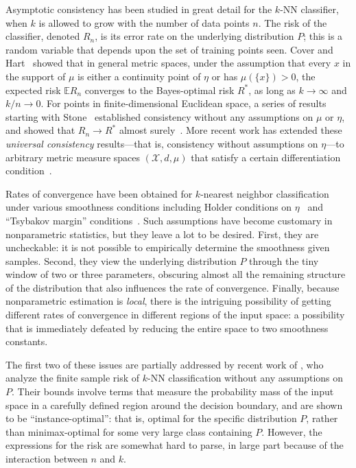 \documentclass{article}
\def\E{{\mathbb E}}
\def\X{{\mathcal X}}
\begin{document}
Asymptotic consistency has been studied in great detail for the $k$-NN classifier, when $k$ is allowed to grow with the number of data points $n$. The risk of the classifier, denoted $R_n$, is its error rate on the underlying distribution $P$; this is a random variable that depends upon the set of training points seen. Cover and Hart~\cite{CH67} showed that in general metric spaces, under the assumption that every $x$ in the support of $\mu$ is either a continuity point of $\eta$ or has $\mu(\{x\}) > 0$, the expected risk $\E R_n$ converges to the Bayes-optimal risk $R^*$, as long as $k \rightarrow \infty$ and $k/n \rightarrow 0$. For points in finite-dimensional Euclidean space, a series of results starting with Stone~\cite{S77} established consistency without any assumptions on $\mu$ or $\eta$, and showed that $R_n \rightarrow R^*$ almost surely~\cite{DGKL94}. More recent work has extended these {\it universal consistency} results---that is, consistency without assumptions on $\eta$---to arbitrary metric measure spaces $(\X, d, \mu)$ that satisfy a certain differentiation condition~\cite{CG06,ChaudhuriDasgupta2014}.

Rates of convergence have been obtained for $k$-nearest neighbor classification under various smoothness conditions including Holder conditions on $\eta$~\cite{KP95,G81} and ``Tsybakov margin'' conditions~\cite{MT99,AT07,ChaudhuriDasgupta2014}. Such assumptions have become customary in nonparametric statistics, but they leave a lot to be desired. First, they are uncheckable: it is not possible to empirically determine the smoothness given samples. Second, they view the underlying distribution $P$ through the tiny window of two or three parameters, obscuring almost all the remaining structure of the distribution that also influences the rate of convergence. Finally, because nonparametric estimation is {\it local}, there is the intriguing possibility of getting different rates of convergence in different regions of the input space: a possibility that is immediately defeated by reducing the entire space to two smoothness constants.

The first two of these issues are partially addressed by recent work of \cite{ChaudhuriDasgupta2014}, who analyze the finite sample risk of $k$-NN classification without any assumptions on $P$. Their bounds involve terms that measure the probability mass of the input space in a carefully defined region around the decision boundary, and are shown to be ``instance-optimal'': that is, optimal for the specific distribution $P$, rather than minimax-optimal for some very large class containing $P$. However, the expressions for the risk are somewhat hard to parse, in large part because of the interaction between $n$ and $k$.
\end{document}
